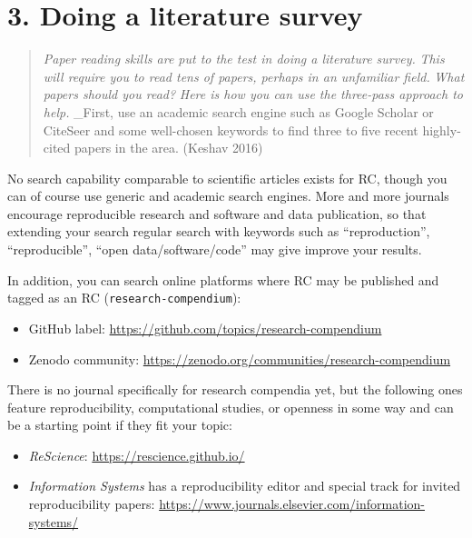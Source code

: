 \documentclass[fleqn,10pt]{wlpeerj} %
\providecommand{\tightlist}{
\setlength{\itemsep}{0pt}\setlength{\parskip}{0pt}}
\begin{document}
\section*{3. Doing a literature survey}\label{doing-a-literature-survey}

\begin{quote}
\emph{Paper reading skills are put to the test in doing a literature
survey.} \emph{This will require you to read tens of papers, perhaps in
an unfamiliar field.} \emph{What papers should you read?} \emph{Here is
how you can use the three-pass approach to help.} \_First, use an
academic search engine such as Google Scholar or CiteSeer and some
well-chosen keywords to find three to five recent highly-cited papers in
the area. (Keshav 2016)
\end{quote}

No search capability comparable to scientific articles exists for RC,
though you can of course use generic and academic search engines. More
and more journals encourage reproducible research and software and data
publication, so that extending your search regular search with keywords
such as ``reproduction'', ``reproducible'', ``open data/software/code''
may give improve your results.

In addition, you can search online platforms where RC may be published
and tagged as an RC (\texttt{research-compendium}):

\begin{itemize}
\tightlist
\item
  GitHub label: \url{https://github.com/topics/research-compendium}
\item
  Zenodo community:
  \url{https://zenodo.org/communities/research-compendium}
\end{itemize}

There is no journal specifically for research compendia yet, but the
following ones feature reproducibility, computational studies, or
openness in some way and can be a starting point if they fit your topic:

\begin{itemize}
\tightlist
\item
  \emph{ReScience}: \url{https://rescience.github.io/}
\item
  \emph{Information Systems} has a reproducibility editor and special
  track for invited reproducibility papers:
  \url{https://www.journals.elsevier.com/information-systems/}
\end{itemize}
\end{document}
